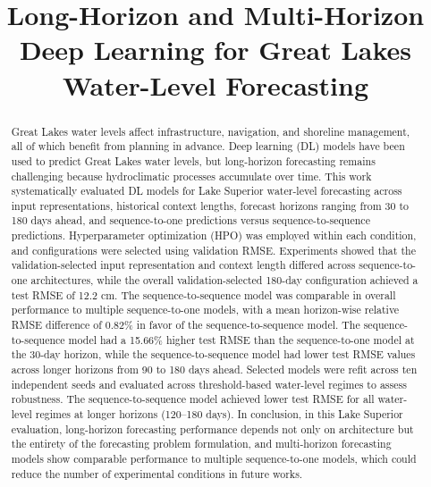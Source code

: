\documentclass[conference]{IEEEtran}
\begin{document}
\title{\vspace{10pt}Long-Horizon and Multi-Horizon Deep Learning for Great Lakes Water-Level Forecasting}

\author{
}

\maketitle

\begin{abstract}

Great Lakes water levels affect infrastructure, navigation, and shoreline management, all of which benefit from planning in advance. Deep learning (DL) models have been used to predict Great Lakes water levels, but long-horizon forecasting remains challenging because hydroclimatic processes accumulate over time. This work systematically evaluated DL models for Lake Superior water-level forecasting across input representations, historical context lengths, forecast horizons ranging from 30 to 180 days ahead, and sequence-to-one predictions versus sequence-to-sequence predictions. Hyperparameter optimization (HPO) was employed within each condition, and configurations were selected using validation RMSE. Experiments showed that the validation-selected input representation and context length differed across sequence-to-one architectures, while the overall validation-selected 180-day configuration achieved a test RMSE of 12.2 cm. The sequence-to-sequence model was comparable in overall performance to multiple sequence-to-one models, with a mean horizon-wise relative RMSE difference of 0.82\% in favor of the sequence-to-sequence model. The sequence-to-sequence model had a 15.66\% higher test RMSE than the sequence-to-one model at the 30-day horizon, while the sequence-to-sequence model had lower test RMSE values across longer horizons from 90 to 180 days ahead. Selected models were refit across ten independent seeds and evaluated across threshold-based water-level regimes to assess robustness. The sequence-to-sequence model achieved lower test RMSE for all water-level regimes at longer horizons (120--180 days). In conclusion, in this Lake Superior evaluation, long-horizon forecasting performance depends not only on architecture but the entirety of the forecasting problem formulation, and multi-horizon forecasting models show comparable performance to multiple sequence-to-one models, which could reduce the number of experimental conditions in future works.


\end{abstract}
\end{document}
